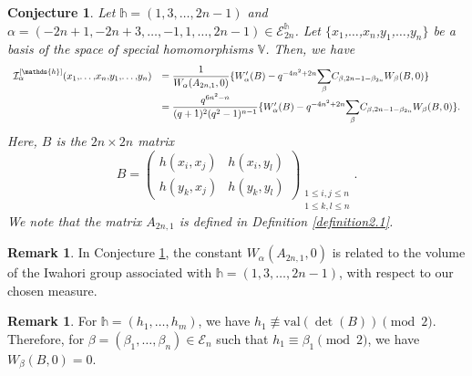 \documentclass[11pt,oneside]{amsart}
\newcommand{\val}{{\mathrm{val}}}
\theoremstyle{plain}
\newtheorem{conjecture}[theorem]{Conjecture}
\theoremstyle{definition}
\newtheorem{remark}[theorem]{Remark}
\theoremstyle{remark}
\newcommand{\BV}{{\mathbb V}}
\newcommand{\CE}{{\mathcal E}}
\newcommand{\CI}{{\mathcal I}}
\numberwithin{equation}{section}
\begin{document}
	
	\begin{conjecture}\label{conjecture4.3} 
		Let $\mathds{h}=(1,3,\dots,2n-1)$ and $\alpha=(-2n+1,-2n+3,\dots,-1,1,\dots,2n-1) \in \CE_{2n}^{\mathds{h}}$. Let $\lbrace x_1$,$\dots$,$x_{n}$,$y_1$,$\dots$,$y_{n} \rbrace$ be a basis of the space of special homomorphisms $\BV$. Then, we have
		\begin{equation*}\begin{array}{ll}
				\CI_{\alpha}^{[\mathds{h}]}(x_1$,$\dots$,$x_{n}$,$y_1$,$\dots$,$y_{n})&=\dfrac{1}{W_{\alpha}(A_{2n,1},0)}	\lbrace W_{\alpha}'(B)-q^{-4n^2+2n}\mathlarger{\sum}_{\beta}C_{\beta,2n-1-\beta_{2n}}W_{\beta}(B,0) \rbrace\\
				&=\dfrac{q^{6n^2-n}}{(q+1)^2(q^2-1)^{n-1}}\lbrace W_{\alpha}'(B)-q^{-4n^2+2n}\mathlarger{\sum}_{\beta}C_{\beta,2n-1-\beta_{2n}}W_{\beta}(B,0) \rbrace.
			\end{array}
		\end{equation*}
		Here, $B$ is the $2n \times 2n$ matrix
		\begin{equation*}
			B=	\left(\begin{array}{cc} 
				h(x_i,x_j) & h(x_i,y_l)\\
				h(y_k,x_j)& h(y_k,y_l)
			\end{array} 
			\right)_{\substack{1\leq i,j \leq n\\ 1 \leq k,l \leq n}}.
		\end{equation*}
		We note that the matrix $A_{2n,1}$ is defined in Definition \ref{definition2.1}.
	\end{conjecture}
	
	
	
	
	\begin{remark}\label{remark4.4}
		In Conjecture \ref{conjecture4.3}, the constant $W_{\alpha}(A_{2n,1},0)$ is related to the volume of the Iwahori group associated with $\mathds{h}=(1,3,\dots,2n-1)$, with respect to our chosen measure.
	\end{remark}
	
	\begin{remark}\label{remark4.5'}
		For $\mathds{h}=(h_1,\dots,h_m)$, we have $h_1 \not\equiv \val(\det(B)) \pmod2$. Therefore, for $\beta=(\beta_1,\dots,\beta_n) \in \CE_{n}$ such that $h_1 \equiv \beta_1 \pmod2$, we have $W_{\beta}(B,0)=0$.
		
		\end{remark}
	
\end{document}
